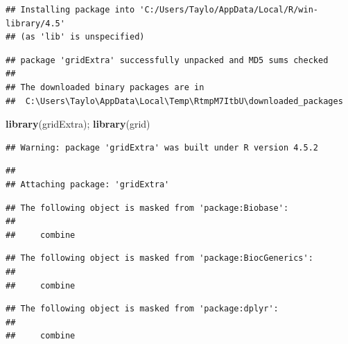 \documentclass[
]{article}
\newenvironment{Shaded}{\begin{snugshade}}{\end{snugshade}}
\newcommand{\FunctionTok}[1]{\textcolor[rgb]{0.13,0.29,0.53}{\textbf{#1}}}
\newcommand{\NormalTok}[1]{#1}
\begin{document}
\begin{verbatim}
## Installing package into 'C:/Users/Taylo/AppData/Local/R/win-library/4.5'
## (as 'lib' is unspecified)
\end{verbatim}

\begin{verbatim}
## package 'gridExtra' successfully unpacked and MD5 sums checked
## 
## The downloaded binary packages are in
##  C:\Users\Taylo\AppData\Local\Temp\RtmpM7ItbU\downloaded_packages
\end{verbatim}

\begin{Shaded}
\begin{Highlighting}[]
\FunctionTok{library}\NormalTok{(gridExtra); }\FunctionTok{library}\NormalTok{(grid)}
\end{Highlighting}
\end{Shaded}

\begin{verbatim}
## Warning: package 'gridExtra' was built under R version 4.5.2
\end{verbatim}

\begin{verbatim}
## 
## Attaching package: 'gridExtra'
\end{verbatim}

\begin{verbatim}
## The following object is masked from 'package:Biobase':
## 
##     combine
\end{verbatim}

\begin{verbatim}
## The following object is masked from 'package:BiocGenerics':
## 
##     combine
\end{verbatim}

\begin{verbatim}
## The following object is masked from 'package:dplyr':
## 
##     combine
\end{verbatim}
\end{document}
